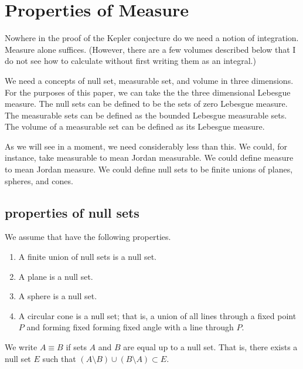 
\section{Properties of Measure}

Nowhere in the proof of the Kepler conjecture do we need a notion
of integration.  Measure alone suffices.  (However, there are a few
volumes described below that I do not see how to calculate without
first writing them as an integral.)

We need a concepts of null set, measurable set, and volume in
three dimensions.  For the purposes of this paper, we can take the
the three dimensional Lebesgue measure.   
The null sets can be defined
to be the sets of zero Lebesgue measure. The measurable sets can
be defined as the bounded Lebesgue measurable sets.  The volume of
a measurable set can be defined as its Lebesgue measure.

As we will see in a moment, we need considerably less than this.
We could, for instance,
take measurable to mean Jordan measurable.   We could define
measure to mean Jordan measure.  We could define null sets to be
finite unions of planes, spheres, and cones.



\subsection{properties of null sets}

We assume that have the following
properties.

\begin{enumerate}%
\item A finite union of null sets is a null set.\\
 \item A plane is a null set.\\
 \item A sphere is a null set.\\
 \item A circular cone is a null set; that is, a union of all
  lines through a fixed point $P$ and forming fixed
 forming fixed angle with a line through $P$.
\end{enumerate}

We write $A\equiv B$ if sets $A$ and $B$ are equal up to a null set.
That is, there exists a null set $E$ such that
   $(A\setminus B) \cup (B\setminus A) \subset E$.

